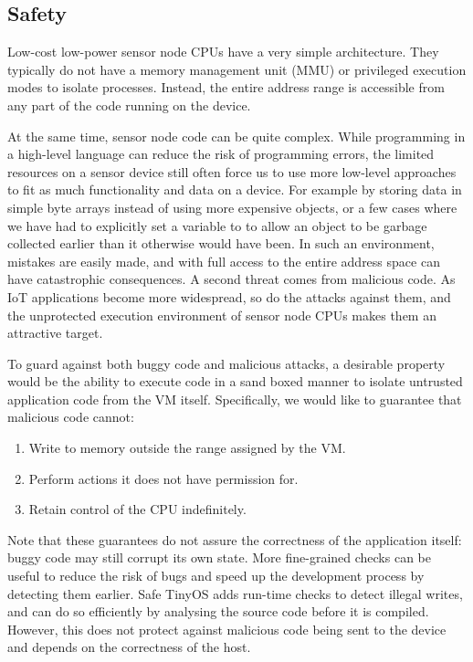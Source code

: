 \subsection{Safety}
\label{sec-introduction-safety}
Low-cost low-power sensor node CPUs have a very simple architecture. They typically do not have a memory management unit (MMU) or privileged execution modes to isolate processes. Instead, the entire address range is accessible from any part of the code running on the device.

At the same time, sensor node code can be quite complex. While programming in a high-level language can reduce the risk of programming errors, the limited resources on a sensor device still often force us to use more low-level approaches to fit as much functionality and data on a device. For example by storing data in simple byte arrays instead of using more expensive objects, or a few cases where we have had to explicitly set a variable to  to allow an object to be garbage collected earlier than it otherwise would have been. In such an environment, mistakes are easily made, and with full access to the entire address space can have catastrophic consequences. A second threat comes from malicious code. As IoT applications become more widespread, so do the attacks against them, and the unprotected execution environment of sensor node CPUs makes them an attractive target.

To guard against both buggy code and malicious attacks, a desirable property would be the ability to execute code in a sand boxed manner to isolate untrusted application code from the VM itself. Specifically, we would like to guarantee that malicious code cannot:
\begin{enumerate}
    \item Write to memory outside the range assigned by the VM.
    \item Perform actions it does not have permission for.
    \item Retain control of the CPU indefinitely.
\end{enumerate}

Note that these guarantees do not assure the correctness of the application itself: buggy code may still corrupt its own state. More fine-grained checks can be useful to reduce the risk of bugs and speed up the development process by detecting them earlier. Safe TinyOS \cite{Cooprider:2007ub} adds run-time checks to detect illegal writes, and can do so efficiently by analysing the source code before it is compiled. However, this does not protect against malicious code being sent to the device and depends on the correctness of the host.

